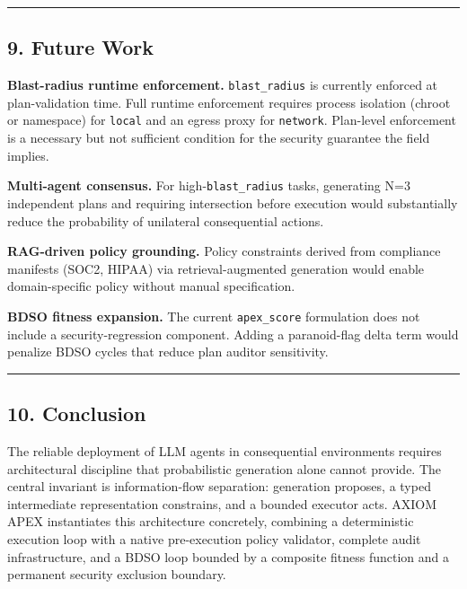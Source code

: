 \documentclass[
]{article}
\begin{document}
\begin{center}\rule{0.5\linewidth}{0.5pt}\end{center}

\subsection{9. Future Work}\label{9-future-work}

\textbf{Blast-radius runtime enforcement.} \texttt{blast\_radius} is
currently enforced at plan-validation time. Full runtime enforcement
requires process isolation (chroot or namespace) for \texttt{local} and
an egress proxy for \texttt{network}. Plan-level enforcement is a
necessary but not sufficient condition for the security guarantee the
field implies.

\textbf{Multi-agent consensus.} For high-\texttt{blast\_radius} tasks,
generating N=3 independent plans and requiring intersection before
execution would substantially reduce the probability of unilateral
consequential actions.

\textbf{RAG-driven policy grounding.} Policy constraints derived from
compliance manifests (SOC2, HIPAA) via retrieval-augmented generation
would enable domain-specific policy without manual specification.

\textbf{BDSO fitness expansion.} The current \texttt{apex\_score}
formulation does not include a security-regression component. Adding a
paranoid-flag delta term would penalize BDSO cycles that reduce plan
auditor sensitivity.

\begin{center}\rule{0.5\linewidth}{0.5pt}\end{center}

\subsection{10. Conclusion}\label{10-conclusion}

The reliable deployment of LLM agents in consequential environments
requires architectural discipline that probabilistic generation alone
cannot provide. The central invariant is information-flow separation:
generation proposes, a typed intermediate representation constrains, and
a bounded executor acts. AXIOM APEX instantiates this architecture
concretely, combining a deterministic execution loop with a native
pre-execution policy validator, complete audit infrastructure, and a
BDSO loop bounded by a composite fitness function and a permanent
security exclusion boundary.
\end{document}
